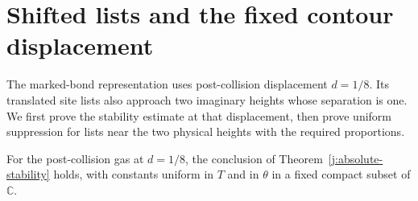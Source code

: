 \section{Shifted lists and the fixed contour displacement}\label{c7:shifted}

The marked-bond representation uses post-collision displacement \(d=1/8\). Its translated site lists also approach two imaginary heights whose separation is one. We first prove the stability estimate at that displacement, then prove uniform suppression for lists near the two physical heights with the required proportions.

\begin{proposition}\label{j:stability-eighth}
For the post-collision gas at \(d=1/8\), the conclusion of Theorem~\ref{j:absolute-stability} holds, with constants uniform in \(T\) and in \(\theta\) in a fixed compact subset of \(\mathbb C\).
\end{proposition}

